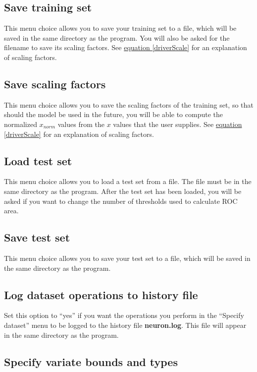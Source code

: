 \subsection{Save training set}

This menu choice allows you to save your training set to a file, which
will be saved in the same directory as the program.  You will also be
asked for the filename to save its scaling factors.
See \hyperref[driverScale]{equation \ref{driverScale}} for an
explanation of scaling factors.

\subsection{Save scaling factors}

This menu choice allows you to save the scaling factors of the
training set, so that should the model be used in the future, you will
be able to compute the normalized $x_{norm}$ values from the $x$
values that the user supplies.  See \hyperref[driverScale]{equation
\ref{driverScale}} for an explanation of scaling factors.

\subsection{Load test set}

This menu choice allows you to load a test set from a file.  The file
must be in the same directory as the program.  After the test set has
been loaded, you will be asked if you want to change the number of
thresholds used to calculate ROC area.

\subsection{Save test set}

This menu choice allows you to save your test set to a file, which
will be saved in the same directory as the program.

\subsection{Log dataset operations to history file}

Set this option to ``yes'' if you want the operations you perform in
the ``Specify dataset'' menu to be logged to the history file {\bf
neuron.log}.  This file will appear in the same directory as the
program.

\subsection{Specify variate bounds and types}

